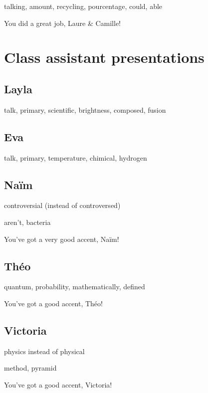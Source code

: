 \documentclass[12pt,oneside]{report}
\begin{document}
\begin{spacing}{1.2}
talking, amount, recycling, pourcentage, could, able

\color{blue}
You did a great job, Laure \& Camille!
\color{black}


\section{Class assistant presentations}



\subsection*{Layla}

talk, primary, scientific, brightness, composed, fusion

\subsection*{Eva}

talk, primary, temperature, chimical, hydrogen

\subsection*{Naïm}

\color{blue}
controversial (instead of controversed)
\color{black}

aren't, bacteria

\color{blue}
You've got a very good accent, Naïm!
\color{black}

\subsection*{Théo}


quantum, probability, mathematically, defined

\color{blue}
You've got a good accent, Théo!
\color{black}


\subsection*{Victoria}

\color{blue}
physics instead of physical
\color{black}

method, pyramid

\color{blue}
You've got a good accent, Victoria!
\color{black}



\end{spacing}
\end{document}
